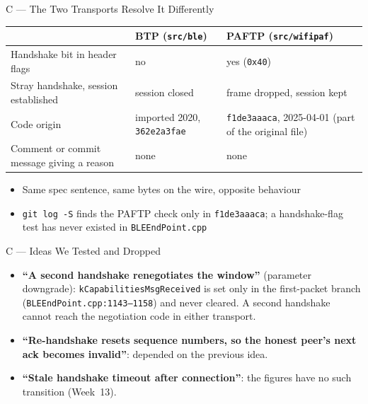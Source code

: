 \documentclass[10pt,aspectratio=169,t]{beamer}
\begin{document}
\begin{frame}{C --- The Two Transports Resolve It Differently}
\begin{center}
\small
\begin{tabular}{p{}p{}p{}}
\toprule
 & \textbf{BTP} (\texttt{src/ble}) & \textbf{PAFTP} (\texttt{src/wifipaf}) \\
\midrule
Handshake bit in header flags & no & yes (\texttt{0x40}) \\
Stray handshake, session established & session closed & frame dropped, session kept \\
Code origin & imported 2020, \texttt{362e2a3fae} & \texttt{f1de3aaaca}, 2025-04-01 (part of the original file) \\
Comment or commit message giving a reason & none & none \\
\bottomrule
\end{tabular}
\end{center}
\begin{itemize}\small
  \item Same spec sentence, same bytes on the wire, opposite behaviour
  \item \texttt{git log -S} finds the PAFTP check only in \texttt{f1de3aaaca};
        a handshake-flag test has never existed in \texttt{BLEEndPoint.cpp}
\end{itemize}
\end{frame}

\begin{frame}{C --- Ideas We Tested and Dropped}
\small
\begin{itemize}
  \item \textbf{``A second handshake renegotiates the window''} (parameter
        downgrade): \texttt{kCapabilitiesMsgReceived} is set only in the
        first-packet branch (\texttt{BLEEndPoint.cpp:1143--1158}) and never
        cleared. A second handshake cannot reach the negotiation code in either
        transport.
  \item \textbf{``Re-handshake resets sequence numbers, so the honest peer's
        next ack becomes invalid''}: depended on the previous idea.
  \item \textbf{``Stale handshake timeout after connection''}: the figures have
        no such transition (Week~13).
\end{itemize}
\end{frame}
\end{document}
